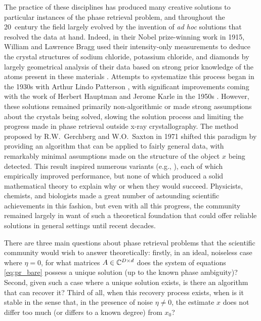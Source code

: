   The practice of these disciplines has produced many creative solutions to particular instances of the phase retrieval problem, and throughout the 20\th\ century the field largely evolved by the invention of \emph{ad hoc} solutions that resolved the data at hand.  Indeed, in their Nobel prize-winning work in 1915, William and Lawrence Bragg used their intensity-only measurements to deduce the crystal structures of sodium chloride, potassium chloride, and diamonds by largely geometrical analysis of their data based on strong prior knowledge of the atoms present in these materials \cite[pp.~88-92, 102-105]{bragg1915crystal_structure}.  Attempts to systematize this process began in the 1930s with Arthur Lindo Patterson \cite{patterson1934fourier_method}, with significant improvements coming with the work of Herbert Hauptman and Jerome Karle in the 1950s \cite{hauptman1953monograph}.  However, these solutions remained primarily non-algorithmic or made strong assumptions about the crystals being solved, slowing the solution process and limiting the progress made in phase retrieval outside x-ray crystallography.  The method proposed by R.W.~Gerchberg and W.O.~Saxton in 1971 \cite{gerchsax} shifted this paradigm by providing an algorithm that can be applied to fairly general data, with remarkably minimal assumptions made on the structure of the object $x$ being detected.  This result inspired numerous variants (e.g., \cite{bauschke2003hybrid, elser2003phase, fienup1978reconstruction}), each of which empirically improved performance, but none of which produced a solid mathematical theory to explain why or when they would succeed.  Physicists, chemists, and biologists made a great number of astounding scientific achievements in this fashion, but even with all this progress, the community remained largely in want of such a theoretical foundation that could offer reliable solutions in general settings until recent decades.

  
  There are three main questions about phase retrieval problems that the scientific community would wish to answer theoretically: firstly, in an ideal, noiseless case where $\eta = 0$, for what matrices $A \in \mathbb{C}^{D \times d}$ does the system of equations \eqref{eq:pr_bare} possess a unique solution (up to the known phase ambiguity)?  Second, given such a case where a unique solution exists, is there an algorithm that can recover it?  Third of all, when this recovery process exists, when is it stable in the sense that, in the presence of noise $\eta \neq 0$, the estimate $x$ does not differ too much (or differs to a known degree) from $x_0$?

